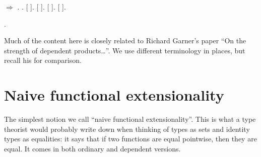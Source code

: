 \documentclass[12pt]{report}
\begin{document}
\begin{coqdoccode}
\coqdocindent{2.00em}
  \ensuremath{\Rightarrow}    .\coqdoceol
\coqdocemptyline
\coqdocnoindent
{} .\coqdoceol
\coqdocemptyline
\coqdocnoindent
{}  [ ].\coqdoceol
\coqdocnoindent
{}  [ ].\coqdoceol
\coqdocnoindent
{}  [ ].\coqdoceol
\coqdocnoindent
{}  [ ].\coqdoceol
\end{coqdoccode}

\begin{coqdoccode}
\coqdocnoindent
{}     .\coqdoceol
\coqdocemptyline
\end{coqdoccode}
Much of the content here is closely related to Richard Garner’s paper “On the strength of dependent products…”.  We use different terminology in places, but recall his for comparison. \begin{coqdoccode}
\coqdocemptyline
\end{coqdoccode}
\section{Naive functional extensionality}

\begin{coqdoccode}
\coqdocemptyline
\end{coqdoccode}
The simplest notion we call “naive functional extensionality”.
   This is what a type theorist would probably write down when
   thinking of types as sets and identity types as equalities: it says
   that if two functions are equal pointwise, then they are equal.  It
   comes in both ordinary and dependent versions. 
\end{document}
